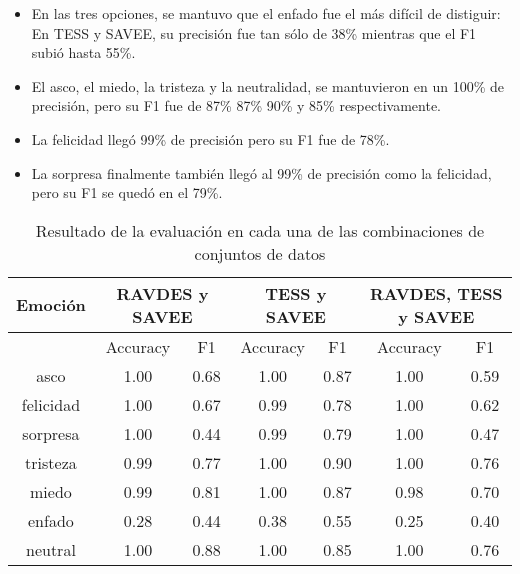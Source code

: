 \documentclass[11pt,a4paper,spanish]{book}
\begin{document}
	\begin{itemize}
		\item En las tres opciones, se mantuvo que el enfado fue el más difícil de distiguir: En TESS y SAVEE, su precisión fue tan sólo de 38\% mientras que el F1 subió hasta 55\%.
		
		\item El asco, el miedo, la tristeza y la neutralidad, se mantuvieron en un 100\% de precisión, pero su F1 fue de 87\% 87\% 90\% y 85\% respectivamente.
		
		\item La felicidad llegó 99\% de precisión pero su F1 fue de 78\%.
		
		\item La sorpresa finalmente también llegó al 99\% de precisión como la felicidad, pero su F1 se quedó en el 79\%.
	\end{itemize}

	
	\begin{table}[H]
		\centering
		\begin{center}
			\begin{tabular}{| c|| c c |  c c |  c c | }
				\hline
					\multicolumn{1}{|c||}{Emoción} & 
					\multicolumn{2}{|c|}{RAVDES y SAVEE}&
					\multicolumn{2}{|c|}{TESS y SAVEE} &
					\multicolumn{2}{|c|}{RAVDES, TESS y SAVEE} \\
				\hline
				 	& 
					 \multicolumn{1}{|c|}{Accuracy}&\multicolumn{1}{|c|}{F1}&
					 \multicolumn{1}{|c|}{Accuracy}&\multicolumn{1}{|c|}{F1}&
					 \multicolumn{1}{|c|}{Accuracy}&\multicolumn{1}{|c|}{F1}\\
				\hline

				asco 		& 1.00 & 0.68 & 1.00 & 0.87 & 1.00 & 0.59\\
				felicidad 	& 1.00 & 0.67 & 0.99 & 0.78 & 1.00 & 0.62\\
				sorpresa 	& 1.00 & 0.44 & 0.99 & 0.79 & 1.00 & 0.47\\
				tristeza 	& 0.99 & 0.77 & 1.00 & 0.90 & 1.00 & 0.76\\
				miedo 		& 0.99 & 0.81 & 1.00 & 0.87 & 0.98 & 0.70\\
				enfado 		& 0.28 & 0.44 & 0.38 & 0.55 & 0.25 & 0.40\\
				neutral 	& 1.00 & 0.88 & 1.00 & 0.85 & 1.00 & 0.76\\
				\hline
			\end{tabular}
			
			\caption{Resultado de la evaluación en cada una de las combinaciones de conjuntos de datos}
			\label{result_Test3}
		\end{center}
	\end{table}
	
\end{document}
